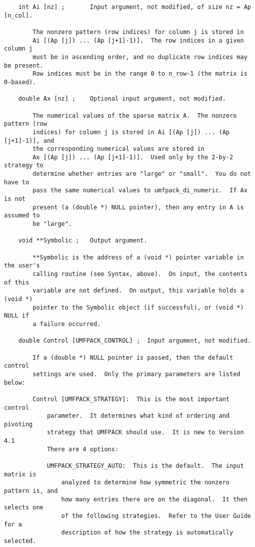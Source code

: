 \documentclass[11pt]{article}
\begin{document}
{\begin{verbatim}
    int Ai [nz] ;       Input argument, not modified, of size nz = Ap [n_col].

        The nonzero pattern (row indices) for column j is stored in
        Ai [(Ap [j]) ... (Ap [j+1]-1)].  The row indices in a given column j
        must be in ascending order, and no duplicate row indices may be present.
        Row indices must be in the range 0 to n_row-1 (the matrix is 0-based).

    double Ax [nz] ;    Optional input argument, not modified.

        The numerical values of the sparse matrix A.  The nonzero pattern (row
        indices) for column j is stored in Ai [(Ap [j]) ... (Ap [j+1]-1)], and
        the corresponding numerical values are stored in
        Ax [(Ap [j]) ... (Ap [j+1]-1)].  Used only by the 2-by-2 strategy to
        determine whether entries are "large" or "small".  You do not have to
        pass the same numerical values to umfpack_di_numeric.  If Ax is not
        present (a (double *) NULL pointer), then any entry in A is assumed to
        be "large".

    void **Symbolic ;   Output argument.

        **Symbolic is the address of a (void *) pointer variable in the user's
        calling routine (see Syntax, above).  On input, the contents of this
        variable are not defined.  On output, this variable holds a (void *)
        pointer to the Symbolic object (if successful), or (void *) NULL if
        a failure occurred.

    double Control [UMFPACK_CONTROL] ;  Input argument, not modified.

        If a (double *) NULL pointer is passed, then the default control
        settings are used.  Only the primary parameters are listed below:

        Control [UMFPACK_STRATEGY]:  This is the most important control
            parameter.  It determines what kind of ordering and pivoting
            strategy that UMFPACK should use.  It is new to Version 4.1
            There are 4 options:

            UMFPACK_STRATEGY_AUTO:  This is the default.  The input matrix is
                analyzed to determine how symmetric the nonzero pattern is, and
                how many entries there are on the diagonal.  It then selects one
                of the following strategies.  Refer to the User Guide for a
                description of how the strategy is automatically selected.


\end{verbatim}}
\end{document}
